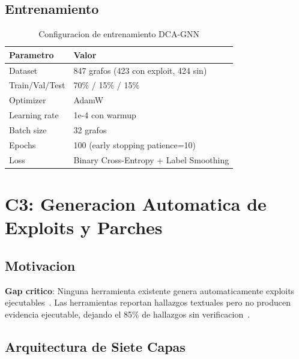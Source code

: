 \documentclass[11pt]{article}
\theoremstyle{definition}
\theoremstyle{plain}
\theoremstyle{remark}
\begin{document}
\subsection{Entrenamiento}

\begin{table}[H]
\centering
\caption{Configuracion de entrenamiento DCA-GNN}
\label{tab:gnn_training}
\begin{tabular}{ll}
\toprule
\textbf{Parametro} & \textbf{Valor} \\
\midrule
Dataset & 847 grafos (423 con exploit, 424 sin) \\
Train/Val/Test & 70\% / 15\% / 15\% \\
Optimizer & AdamW~\cite{loshchilov2017decoupled} \\
Learning rate & 1e-4 con warmup \\
Batch size & 32 grafos \\
Epochs & 100 (early stopping patience=10) \\
Loss & Binary Cross-Entropy + Label Smoothing \\
\bottomrule
\end{tabular}
\end{table}

\section{C3: Generacion Automatica de Exploits y Parches}
\label{sec:gaev}

\subsection{Motivacion}

\textbf{Gap critico}: Ninguna herramienta existente genera automaticamente exploits ejecutables~\cite{zhang2023demystifying}. Las herramientas reportan hallazgos textuales pero no producen evidencia ejecutable, dejando el 85\% de hallazgos sin verificacion~\cite{chen2021defiranger}.

\subsection{Arquitectura de Siete Capas}
\end{document}
